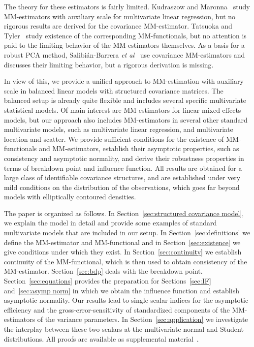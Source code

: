 \documentclass{article}
\numberwithin{equation}{section}
\theoremstyle{plain}
\begin{document}
The theory for these estimators is fairly limited.
Kudraszow and Maronna~\cite{kudraszow-maronna2011} study
MM-estimators with auxiliary scale for multivariate linear regression, 
but no rigorous results are derived for the covariance MM-estimator.
Tatsuoka and Tyler~\cite{tatsuoka&tyler2000} study existence of the corresponding MM-functionals,
but no attention is paid to the limiting behavior of the MM-estimators themselves.
As a basis for a robust PCA method, Salibi\'an-Barrera \emph{et al}~\cite{SalibianBarrera-VanAelst-Willems2006}
use covariance MM-estimators and discusses their limiting behavior, but a rigorous derivation is missing.

In view of this, we provide a unified approach to MM-estimation with auxiliary scale in balanced linear models with structured covariance matrices.
The balanced setup is already quite flexible and includes several specific multivariate statistical models.
Of main interest are MM-estimators for linear mixed effects models, but our approach also includes
MM-estimators in several other standard multivariate models, such as 
multivariate linear regression, and multivariate location and scatter.
We provide sufficient conditions for the existence of MM-functionals and MM-estimators,
establish their asymptotic properties, such as consistency and asymptotic normality,
and derive their robustness properties in terms of breakdown point and influence function.
All results are obtained for a large class of identifiable covariance structures, and are established under very mild conditions
on the distribution of the observations, which goes far beyond models with elliptically contoured densities.

The paper is organized as follows.
In Section~\ref{sec:structured covariance model}, we explain the model in detail and
provide some examples of standard multivariate models that are included in our setup.
In Section~\ref{sec:definitions} we define the MM-estimator and MM-functional
and in Section~\ref{sec:existence} we give conditions under which they exist.
In Section~\ref{sec:continuity} we establish continuity of the MM-functional, which is then used to
obtain consistency of the MM-estimator.
Section~\ref{sec:bdp} deals with the breakdown point.
Section~\ref{sec:equations} provides the preparation for Sections~\ref{sec:IF}
and~\ref{sec:asymp norm} in which we obtain the influence function and establish asymptotic normality.
Our results lead to single scalar indices for the asymptotic efficiency and the gross-error-sensitivity of
standardized components of the MM-estimators of the variance parameters.
In Section~\ref{sec:application} we investigate the interplay between these two scalars at the multivariate
normal and Student distributions.
All proofs are available as supplemental material~\cite{supplement2025}.
\end{document}
